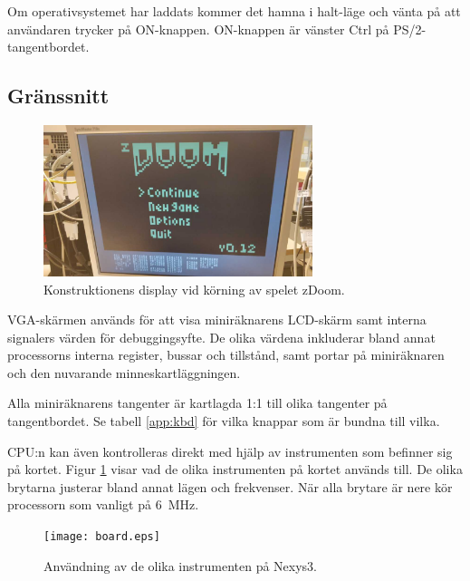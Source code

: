 \documentclass[main.tex]{subfiles}
\begin{document}
Om operativsystemet har laddats kommer det hamna i halt-läge och vänta på att
användaren trycker på ON-knappen. ON-knappen är vänster Ctrl på
PS/2-tangentbordet.

\subsection{Gränssnitt}
\begin{figure}
    \centering
    \includegraphics[width=0.7\textwidth,bb=0 0 1152 648]{img/monitor_small.jpg}
    \caption{Konstruktionens display vid körning av spelet zDoom.}
\end{figure}

VGA-skärmen används för att visa miniräknarens LCD-skärm samt interna signalers
värden för debuggingsyfte. De olika värdena inkluderar bland annat processorns
interna register, bussar och tillstånd, samt portar på miniräknaren och den
nuvarande minneskartläggningen.

Alla miniräknarens tangenter är kartlagda 1:1 till olika tangenter på
tangentbordet. Se tabell \ref{app:kbd} för vilka knappar som är bundna till
vilka.

CPU:n kan även kontrolleras direkt med hjälp av instrumenten som befinner sig
på kortet. Figur \ref{fig:interface} visar vad de olika instrumenten på kortet
används till. De olika brytarna justerar bland annat lägen och frekvenser. När
alla brytare är nere kör processorn som vanligt på \SI{6}{\mega\hertz}.

\begin{figure}[b]
    \centering
    \texttt{[image: board.eps]}
    \caption{Användning av de olika instrumenten på Nexys3.}
    \label{fig:interface}
\end{figure}
\end{document}

